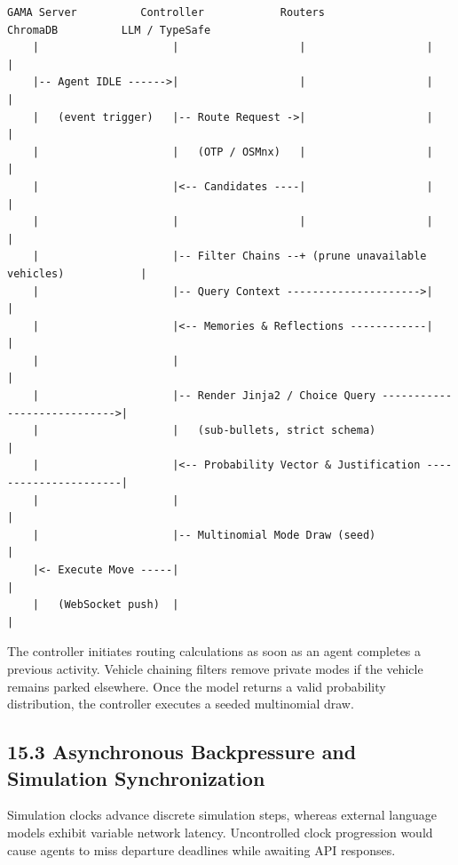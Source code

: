 \begin{Verbatim}
GAMA Server          Controller            Routers             ChromaDB          LLM / TypeSafe
    |                     |                   |                   |                     |
    |-- Agent IDLE ------>|                   |                   |                     |
    |   (event trigger)   |-- Route Request ->|                   |                     |
    |                     |   (OTP / OSMnx)   |                   |                     |
    |                     |<-- Candidates ----|                   |                     |
    |                     |                   |                   |                     |
    |                     |-- Filter Chains --+ (prune unavailable vehicles)            |
    |                     |-- Query Context --------------------->|                     |
    |                     |<-- Memories & Reflections ------------|                     |
    |                     |                                                             |
    |                     |-- Render Jinja2 / Choice Query ---------------------------->|
    |                     |   (sub-bullets, strict schema)                              |
    |                     |<-- Probability Vector & Justification ----------------------|
    |                     |                                                             |
    |                     |-- Multinomial Mode Draw (seed)                              |
    |<- Execute Move -----|                                                             |
    |   (WebSocket push)  |                                                             |
\end{Verbatim}

The controller initiates routing calculations as soon as an agent completes a previous activity. Vehicle chaining filters remove private modes if the vehicle remains parked elsewhere. Once the model returns a valid probability distribution, the controller executes a seeded multinomial draw.

\subsection{15.3 Asynchronous Backpressure and Simulation Synchronization}

Simulation clocks advance discrete simulation steps, whereas external language models exhibit variable network latency. Uncontrolled clock progression would cause agents to miss departure deadlines while awaiting API responses.

